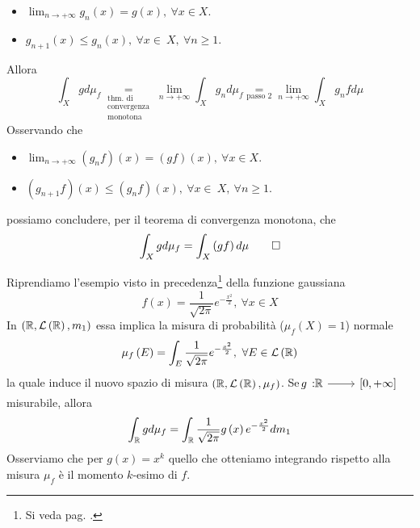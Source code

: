 \begin{demonstration}
\begin{enumerate}[label=\Roman*]
	\begin{itemize}
		\item $\displaystyle\lim_{n\to+\infty}g_n\left(x\right)=g\left(x\right),\ \forall x\in X$.
		\item $g_{n+1}\left(x\right)\leq g_n\left(x\right),\ \forall x\in\ X,\ \forall n\geq 1$.
	\end{itemize}
Allora
	\begin{equation*}
	\int_Xgd\mu_f\underset{\substack{\text{thm. di}\\\text{convergenza}\\\text{monotona}}}{=}\lim_{n\to+\infty}\int_Xg_nd\mu_f\underset{\text{passo }2}{=}\lim_{n\to+\infty}\int_Xg_nfd\mu
	\end{equation*}
Osservando che
\begin{itemize}
	\item $\displaystyle\lim_{n\to+\infty}\left(g_nf\right)\left(x\right)=\left(gf\right)\left(x\right),\ \forall x\in X$.
	\item $\left(g_{n+1}f\right)\left(x\right)\leq \left(g_nf\right)\left(x\right),\ \forall x\in\ X,\ \forall n\geq 1$.
\end{itemize}
possiamo concludere, per il teorema di convergenza monotona, che
\begin{equation*}
	\int_Xgd\mu_f=\int_X\left(gf\right)d\mu\qedhere
\end{equation*}
	\end{enumerate}
\end{demonstration}
\begin{example}
	Riprendiamo l'esempio visto in precedenza\footnote{Si veda pag. \pageref{gaussiana}.} della funzione gaussiana
	\begin{equation*}
		f\left(x\right)=\frac{1}{\sqrt{2\pi}}e^{-\frac{x^2}{2}},\ \forall x\in X
	\end{equation*}
	In $\left(\mathbb{R},\mathcal{L}\left(\mathbb{R}\right),m_1\right)$ essa implica la misura di probabilità ($\mu_f\left(X\right)=1$) normale
	\begin{equation*}
		\mu_f\left(E\right)=\int_E\frac{1}{\sqrt{2\pi}}e^{-\frac{x^2}{2}},\ \forall E\in \mathcal{L}\left(\realset\right)
	\end{equation*}
la quale induce il nuovo spazio di misura $\left(\mathbb{R},\mathcal{L}\left(\mathbb{R}\right),\mu_f\right)$. Se $\funz{g}{\realset}{\left[0,+\infty\right]}$ misurabile, allora
\begin{equation*}
	\int_{\mathbb{R}} gd\mu_f=\int_{\mathbb{R}}\frac{1}{\sqrt{2\pi}}g\left(x\right)e^{-\frac{x^2}{2}}dm_1
\end{equation*}
Osserviamo che per $g\left(x\right)=x^k$ quello che otteniamo integrando rispetto alla misura $\mu_f$ è il momento $k$-esimo di $f$.
\end{example}
